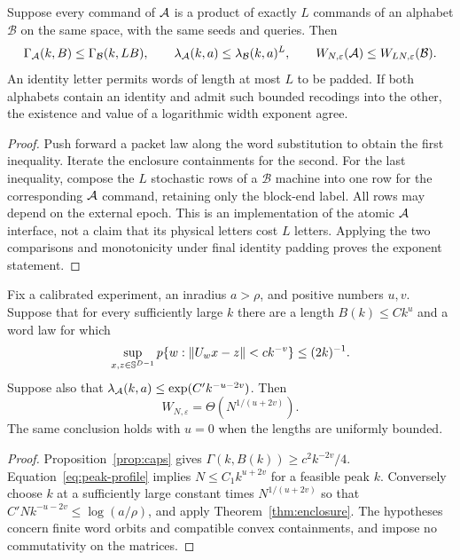 \begin{proposition}\label{prop:recoding}
Suppose every command of $\mathcal A$ is a product of exactly $L$ commands of an alphabet $\mathcal B$ on the same space, with the same seeds and queries. Then
\[
 \Gamma_{\mathcal A}(k,B)\le\Gamma_{\mathcal B}(k,LB),\qquad
 \lambda_{\mathcal A}(k,a)\le\lambda_{\mathcal B}(k,a)^L,
 \qquad W_{N,\varepsilon}(\mathcal A)\le W_{LN,\varepsilon}(\mathcal B).
\]
An identity letter permits words of length at most $L$ to be padded. If both alphabets contain an identity and admit such bounded recodings into the other, the existence and value of a logarithmic width exponent agree.
\end{proposition}
\begin{proof}
Push forward a packet law along the word substitution to obtain the first inequality. Iterate the enclosure containments for the second. For the last inequality, compose the $L$ stochastic rows of a $\mathcal B$ machine into one row for the corresponding $\mathcal A$ command, retaining only the block-end label. All rows may depend on the external epoch. This is an implementation of the atomic $\mathcal A$ interface, not a claim that its physical letters cost $L$ letters. Applying the two comparisons and monotonicity under final identity padding proves the exponent statement.
\end{proof}

\begin{corollary}\label{cor:balance}
Fix a calibrated experiment, an inradius $a>\rho$, and positive numbers $u,v$. Suppose that for every sufficiently large $k$ there are a length $B(k)\le Ck^u$ and a word law for which
\[
 \sup_{x,z\in\mathbb S^{D-1}}p\{w:\lVert U_wx-z\rVert<c k^{-v}\}\le(2k)^{-1}.
\]
Suppose also that $\lambda_{\mathcal A}(k,a)\le\exp(C'k^{-u-2v})$. Then
\[
                         W_{N,\varepsilon}=\Theta(N^{1/(u+2v)}).
\]
The same conclusion holds with $u=0$ when the lengths are uniformly bounded.
\end{corollary}
\begin{proof}
Proposition~\ref{prop:caps} gives $\Gamma(k,B(k))\ge c^2k^{-2v}/4$. Equation~\eqref{eq:peak-profile} implies $N\le C_1k^{u+2v}$ for a feasible peak $k$. Conversely choose $k$ at a sufficiently large constant times $N^{1/(u+2v)}$ so that $C'Nk^{-u-2v}\le\log(a/\rho)$, and apply Theorem~\ref{thm:enclosure}. The hypotheses concern finite word orbits and compatible convex containments, and impose no commutativity on the matrices.
\end{proof}
